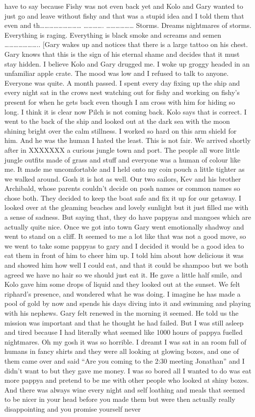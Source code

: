 have to say because Fishy was not even back yet and Kolo and Gary wanted to just go and leave without fishy and that was a stupid idea and I told them that even and th……………………… …………. ……………… Storms. Dreams nightmares of storms. Everything is raging. Everything is black smoke and screams and semen ………………….. [Gary wakes up and notices that there is a large tattoo on his chest. Gary knows that this is the sign of his eternal shame and decides that it must stay hidden. I believe Kolo and Gary drugged me. I woke up groggy headed in an unfamiliar apple crate. The mood was low and I refused to talk to anyone. Everyone was quite. A month passed. I spent every day fixing up the ship and every night sat in the crows nest watching out for fishy and working on fishy’s present for when he gets back even though I am cross with him for hiding so long. I think it is clear now Pilch is not coming back. Kolo says that is correct. I went to the back of the ship and looked out at the dark sea with the moon shining bright over the calm stillness. I worked so hard on this arm shield for him. And he was the human I hated the least. This is not fair. We arrived shortly after in XXXXXXX a curious jungle town and port. The people all wore little jungle outfits made of grass and stuff and everyone was a human of colour like me. It made me uncomfortable and I held onto my coin pouch a little tighter as we walked around. Gosh it is hot as well. Our two sailors, Kev and his brother Archibald, whose parents couldn’t decide on posh names or common names so chose both. They decided to keep the boat safe and fix it up for our getaway. I looked over at the gleaming beaches and lovely sunlight but it just filled me with a sense of sadness. But saying that, they do have pappyas and mangoes which are actually quite nice. Once we got into town Gary went emotionally shadwoy and went to stand on a cliff. It seemed to me a lot like that was not a good move, so we went to take some pappyas to gary and I decided it would be a good idea to eat them in front of him to cheer him up. I told him about how delicious it was and showed him how well I could eat, and that it could be shampoo but we both agreed we have no hair so we should just eat it. He gave a little half smile, and Kolo gave him some drops of liquid and they looked out at the sunset. We felt riphard’s presence, and wondered what he was doing. I imagine he has made a pool of gold by now and spends his days diving into it and swimming and playing with his nephews. Gary felt renewed in the morning it seemed. He told us the mission was important and that he thought he had failed. But I was still asleep and tired because I had literally what seemed like 1000 hours of pappya fuelled nightmares. Oh my gosh it was so horrible. I dreamt I was sat in an room full of humans in fancy shirts and they were all looking at glowing boxes, and one of them came over and said “Are you coming to the 2:30 meeting Jonathan” and I didn’t want to but they gave me money. I was so bored all I wanted to do was eat more pappya and pretend to be me with other people who looked at shiny boxes. And there was always wine every night and self loathing and meals that seemed to be nicer in your head before you made them but were then actually really disappointing and you promise yourself never 